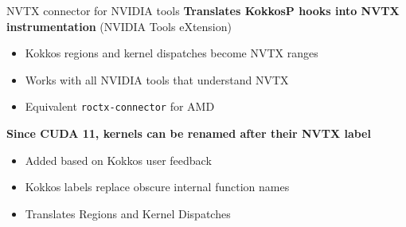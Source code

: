 
\begin{frame}{NVTX connector for NVIDIA tools}
  \textbf{Translates KokkosP hooks into NVTX instrumentation} (NVIDIA Tools eXtension)

  \begin{itemize}
    \item Kokkos regions and kernel dispatches become NVTX ranges
    \item Works with all NVIDIA tools that understand NVTX
    \item Equivalent \texttt{roctx-connector} for AMD
  \end{itemize}

  \pause
  \vspace{10pt}
  \textbf{Since CUDA 11, kernels can be renamed after their NVTX label}
  \begin{itemize}
    \item Added based on Kokkos user feedback
    \item Kokkos labels replace obscure internal function names
    \item Translates Regions and Kernel Dispatches
  \end{itemize}

\end{frame}



